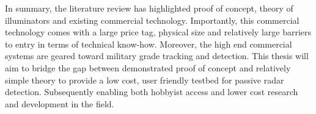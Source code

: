 \vspace{0.5cm}
In summary, the literature review has highlighted proof of concept, theory of illuminators and existing commercial technology. Importantly, this commercial technology comes with a large price tag, physical size and relatively large barriers to entry in terms of technical know-how. Moreover, the high end commercial systems are geared toward military grade tracking and detection. This thesis will aim to bridge the gap between demonstrated proof of concept and relatively simple theory to provide a low cost, user friendly testbed for passive radar detection. Subsequently enabling both hobbyist access and lower cost research and development in the field.